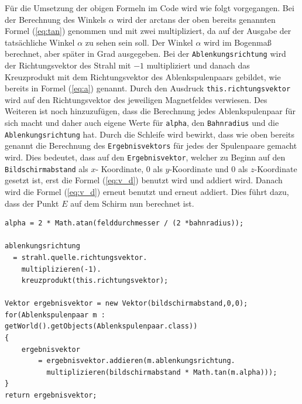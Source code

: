 Für die Umsetzung der obigen Formeln im Code wird wie folgt vorgegangen. 
Bei der Berechnung des Winkels $\alpha$ wird der arctans der oben bereits genannten Formel (\ref{eq:tan}) genommen und mit zwei multipliziert, da auf der Ausgabe der tatsächliche Winkel $\alpha$ zu sehen sein soll.
Der Winkel $\alpha$ wird im Bogenmaß berechnet, aber später in Grad ausgegeben.
Bei der \lstinline$Ablenkungsrichtung$ wird der Richtungsvektor des Strahl mit $-1$ multipliziert und danach das Kreuzprodukt mit dem Richtungsvektor des Ablenkspulenpaars gebildet, wie bereits in Formel (\ref{eq:a}) genannt.
Durch den Ausdruck \lstinline$this.richtungsvektor$ wird auf den Richtungsvektor des jeweiligen Magnetfeldes verwiesen.
Des Weiteren ist noch hinzuzufügen, dass die Berechnung jedes Ablenkspulenpaar für sich macht und daher auch eigene Werte für \lstinline$alpha$, den \lstinline$Bahnradius$ und die \lstinline$Ablenkungsrichtung$ hat.
Durch die Schleife wird bewirkt, dass wie oben bereits genannt die Berechnung des \lstinline$Ergebnisvektors$ für jedes der Spulenpaare gemacht wird.
Dies bedeutet, dass auf den \lstinline$Ergebnisvektor$, welcher zu Beginn auf den \lstinline$Bildschirmabstand$ als $x$- Koordinate, $0$ als $y$-Koordinate und 0 als $z$-Koordinate gesetzt ist, erst die Formel (\ref{eq:v_d}) benutzt wird und addiert wird.
Danach wird die Formel (\ref{eq:v_d}) erneut benutzt und erneut addiert. Dies führt dazu, dass der Punkt $E$ auf dem Schirm nun berechnet ist.

\begin{lstlisting}
alpha = 2 * Math.atan(felddurchmesser / (2 *bahnradius));

ablenkungsrichtung
  = strahl.quelle.richtungsvektor.
    multiplizieren(-1).
    kreuzprodukt(this.richtungsvektor);

Vektor ergebnisvektor = new Vektor(bildschirmabstand,0,0);
for(Ablenkspulenpaar m : getWorld().getObjects(Ablenkspulenpaar.class))
{
    ergebnisvektor
        = ergebnisvektor.addieren(m.ablenkungsrichtung.
          multiplizieren(bildschirmabstand * Math.tan(m.alpha)));
}
return ergebnisvektor;
\end{lstlisting}

     
